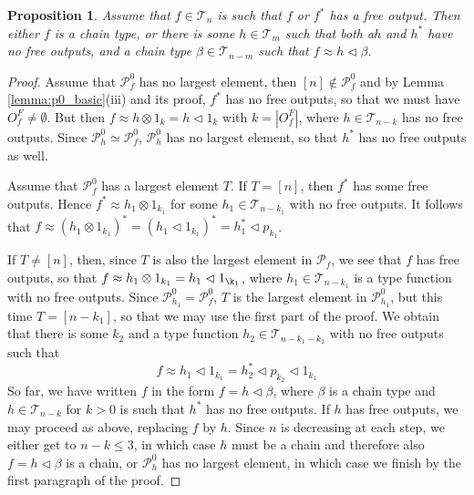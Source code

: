 \documentclass[12pt]{article}
\newtheorem{prop}{Proposition}
\theoremstyle{definition}
\theoremstyle{remark}
\def\Te{\mathcal T}
\def\Pe{\mathcal P}
\def\vtl{\vartriangleleft}
\begin{document}
\begin{prop}\label{prop:pf0_largest} Assume that $f\in \Te_n$ is such that $f$ or $f^*$
has a free output.   Then
either $f$ is a chain type, or there is some $h\in \Te_m$ such that both a$h$ and $h^*$
have no free outputs, and  a chain type $\beta\in \Te_{n-m}$ such that $f\approx h\vtl \beta$.

\end{prop}



\begin{proof} Assume that $\Pe_f^0$ has no largest element, then $[n]\notin \Pe_f^0$ and by Lemma
\ref{lemma:p0_basic}(iii) and its proof,  $f^*$ has no free outputs, so that we must have $O_f^F\ne \emptyset$. But
then $f\approx h\otimes 1_k=h\vtl 1_k$ with $k=|O_f^F|$, where $h\in \Te_{n-k}$ has no
free outputs. Since $\Pe_h^0\simeq \Pe_f^0$, $\Pe_h^0$ has no largest element, so that
$h^*$ has no free outputs as well. 

Assume that $\Pe_f^0$ has a largest element $T$. If $T=[n]$, then $f^*$ has some free outputs. Hence
$f^*\approx h_1\otimes 1_{k_1}$ for some $h_1\in \Te_{n-k_1}$ with no free outputs. It follows that
$f\approx (h_1\otimes 1_{k_1})^*=(h_1\vtl 1_{k_1})^*=h_1^*\vtl p_{k_1}$. 

If $T\ne [n]$, then, since $T$  
is also the largest element in $\Pe_f$, we see that $f$ has free outputs, so that
$f\approx h_1\otimes 1_{k_1}=h_1\vtl 1_{\k_1}$, where $h_1\in \Te_{n-k_1}$ is a type function with no
free outputs. Since $\Pe_{h_1}^0=\Pe_f^0$,  $T$ is the largest
element in $\Pe^0_{h_1}$, but this time $T=[n-k_1]$, so that we may use the first part of the
proof. We obtain that there is some $k_2$ and a type function  $h_2\in\Te_{n-k_1-k_2}$
with no free outputs such that 
\[
f\approx h_1\vtl 1_{k_1}=h_2^*\vtl p_{k_2}\vtl 1_{k_1}
\]
So far, we have written $f$ in the form $f=h\vtl \beta$, where $\beta$ is a chain type and
$h\in \Te_{n-k}$ for $k>0$ is such that $h^*$ has no free outputs. If $h$ has free
outputs, we  may proceed as above, replacing $f$ by $h$. Since $n$ is decreasing at each step, we
 either get to $n-k \le 3$, in which case $h$ must be a chain and therefore also $f=h\vtl
 \beta$ is a chain, or $\Pe^0_h$ has no largest element, in which case we finish  by the
 first paragraph of the proof.


\end{proof}
\end{document}
